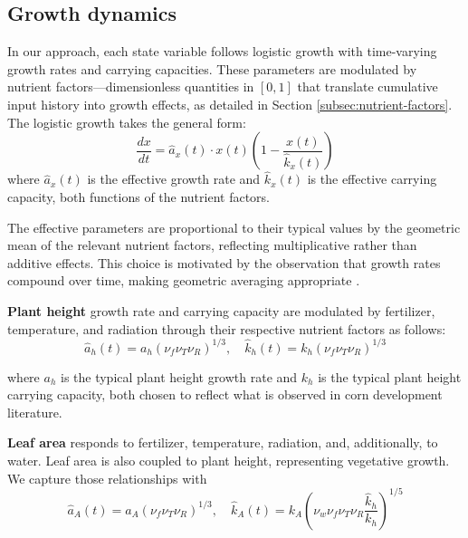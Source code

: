\documentclass[pdflatex,sn-mathphys-num]{sn-jnl}
\newcommand{\df}[2]{\displaystyle\frac{#1}{#2}}
\begin{document}
\subsection{Growth dynamics}\label{subsec:dynamics}

In our approach, each state variable follows logistic growth with time-varying growth rates and carrying capacities. These parameters are modulated by nutrient factors---dimensionless quantities in $[0,1]$ that translate cumulative input history into growth effects, as detailed in Section \ref{subsec:nutrient-factors}. The logistic growth takes the general form:
\begin{equation}
\df{dx}{dt} = \hat{a}_{x}(t) \cdot x(t) \left( 1 - \df{x(t)}{\hat{k}_{x}(t)} \right)
\label{eqn:logistic-general}
\end{equation}
where $\hat{a}_{x}(t)$ is the effective growth rate and $\hat{k}_{x}(t)$ is the effective carrying capacity, both functions of the nutrient factors.

The effective parameters are proportional to their typical values by the geometric mean of the relevant nutrient factors, reflecting multiplicative rather than additive effects. This choice is motivated by the observation that growth rates compound over time, making geometric averaging appropriate \cite{geometric-mean-growth}.

\textbf{Plant height} growth rate and carrying capacity are modulated by fertilizer, temperature, and radiation     
  through their respective nutrient factors as follows:
\begin{equation}
\hat{a}_{h}(t) = a_{h}(\nu_{f}\nu_{T}\nu_{R})^{1/3}, \quad \hat{k}_{h}(t) = k_{h}(\nu_{f}\nu_{T}\nu_{R})^{1/3}
\label{eqn:hats-for-h}
\end{equation}

\noindent where $a_{h}$ is the typical plant height growth rate and $k_{h}$ is the typical plant height carrying capacity, both chosen to reflect what is observed in corn development literature.

\textbf{Leaf area} responds to fertilizer, temperature, radiation, and, additionally, to water. Leaf area is also coupled to plant height, representing vegetative growth. We capture those relationships with
\begin{equation}
\hat{a}_{A}(t) = a_{A}(\nu_{f}\nu_{T}\nu_{R})^{1/3}, \quad \hat{k}_{A}(t) = k_{A}\left(\nu_{w}\nu_{f}\nu_{T}\nu_{R}\df{\hat{k}_{h}}{k_{h}}\right)^{1/5}
\label{eqn:hats-for-A}
\end{equation}
\end{document}
